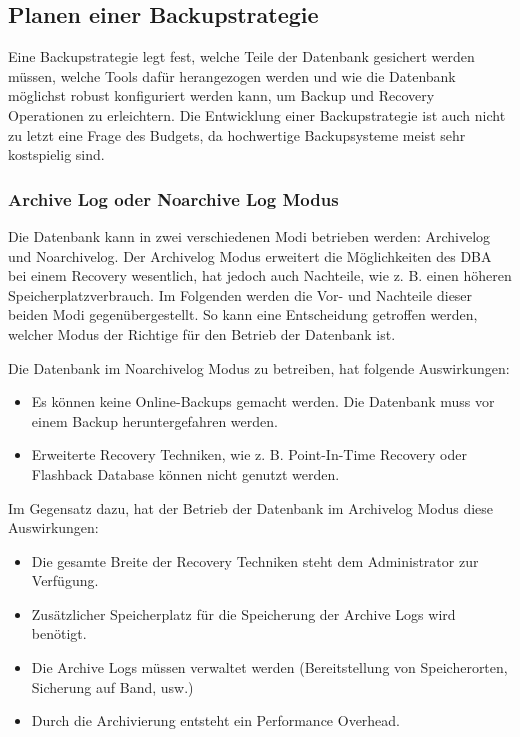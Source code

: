       \subsection{Planen einer Backupstrategie}
        Eine Backupstrategie legt fest, welche Teile der Datenbank gesichert werden müssen, welche Tools dafür herangezogen werden und wie die Datenbank möglichst robust konfiguriert werden kann, um Backup und Recovery Operationen zu erleichtern. Die Entwicklung einer Backupstrategie ist auch nicht zu letzt eine Frage des Budgets, da hochwertige Backupsysteme meist sehr kostspielig sind.
        \subsubsection{Archive Log oder Noarchive Log Modus}
          Die Datenbank kann in zwei verschiedenen Modi betrieben werden: Archivelog und Noarchivelog. Der Archivelog Modus erweitert die Möglichkeiten des DBA bei einem Recovery wesentlich, hat jedoch auch Nachteile, wie z. B. einen höheren Speicherplatzverbrauch. Im Folgenden werden die Vor- und Nachteile dieser beiden Modi gegenübergestellt. So kann eine Entscheidung getroffen werden, welcher Modus der Richtige für den Betrieb der Datenbank ist.

          Die Datenbank im Noarchivelog Modus zu betreiben, hat folgende Auswirkungen:
          \begin{itemize}
            \item Es können keine Online-Backups gemacht werden. Die Datenbank muss vor einem Backup heruntergefahren werden.
            \item Erweiterte Recovery Techniken, wie z. B. Point-In-Time Recovery oder Flashback Database können nicht genutzt werden.
          \end{itemize}
          Im Gegensatz dazu, hat der Betrieb der Datenbank im Archivelog Modus diese Auswirkungen:
          \begin{itemize}
            \item Die gesamte Breite der Recovery Techniken steht dem Administrator zur Verfügung.
            \item Zusätzlicher Speicherplatz für die Speicherung der Archive Logs wird benötigt.
            \item Die Archive Logs müssen verwaltet werden (Bereitstellung von Speicherorten, Sicherung auf Band, usw.)
            \item Durch die Archivierung entsteht ein Performance Overhead.
          \end{itemize}
